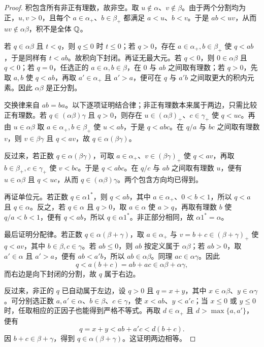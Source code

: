 \begin{proof}
积包含所有非正有理数，故非空。取 \(u\notin\alpha\)、\(v\notin\beta\)。由于两个分割均为正，\(u,v>0\)，且每个 \(a\in\alpha_+\)、\(b\in\beta_+\) 都满足 \(a<u\)、\(b<v\)。于是 \(ab<uv\)，从而 \(uv\notin\alpha\beta\)，积不是全体 \(\mathbb{Q}\)。

若 \(q\in\alpha\beta\) 且 \(t<q\)，则 \(q\le0\) 时 \(t\le0\)；若 \(q>0\)，存在 \(a\in\alpha_+,b\in\beta_+\) 使 \(q<ab\)，于是同样有 \(t<ab\)。故积向下封闭。再证无最大元。若 \(q<0\)，则 \(0\in\alpha\beta\) 且 \(q<0\)；若 \(q=0\)，任选正的 \(a\in\alpha,b\in\beta\)，在 \(0\) 与 \(ab\) 之间取有理数；若 \(q>0\)，先取 \(a,b\) 使 \(q<ab\)，再取 \(a'\in\alpha_+\) 且 \(a'>a\)，便可在 \(q\) 与 \(a'b\) 之间取更大的积内元素。因此 \(\alpha\beta\) 是正分割。

交换律来自 \(ab=ba\)。以下逐项证明结合律；非正有理数本来属于两边，只需比较正有理数。若 \(q\in(\alpha\beta)\gamma\) 且 \(q>0\)，则存在 \(u\in(\alpha\beta)_+\)、\(c\in\gamma_+\) 使 \(q<uc\)。再由 \(u\in\alpha\beta\) 取 \(a\in\alpha_+,b\in\beta_+\) 使 \(u<ab\)，于是 \(q<abc\)。在 \(q/a\) 与 \(bc\) 之间取有理数 \(v\)，则 \(v\in\beta\gamma\) 且 \(q<av\)，故 \(q\in\alpha(\beta\gamma)\)。

反过来，若正数 \(q\in\alpha(\beta\gamma)\)，可取 \(a\in\alpha_+\)、\(v\in(\beta\gamma)_+\) 使 \(q<av\)，再取 \(b\in\beta_+,c\in\gamma_+\) 使 \(v<bc\)。于是 \(q<abc\)。在 \(q/c\) 与 \(ab\) 之间取有理数 \(u\)，便有 \(u\in\alpha\beta\) 且 \(q<uc\)，从而 \(q\in(\alpha\beta)\gamma\)。两个包含方向均已得到。

再证单位元。若正数 \(q\in\alpha1^*\)，则 \(q<ab\)，其中 \(a\in\alpha_+\)、\(0<b<1\)，所以 \(q<a\) 且 \(q\in\alpha\)。反之，若 \(q\in\alpha\) 且 \(q>0\)，取 \(a\in\alpha\) 使 \(a>q\)，再取有理数 \(b\) 使 \(q/a<b<1\)，便有 \(q<ab\)，所以 \(q\in\alpha1^*\)。非正部分相同，故 \(\alpha1^*=\alpha\)。

最后证明分配律。若正数 \(q\in\alpha(\beta+\gamma)\)，取 \(a\in\alpha_+\) 与 \(v=b+c\in(\beta+\gamma)_+\) 使 \(q<av\)，其中 \(b\in\beta,c\in\gamma\)。若 \(ab\le0\)，则 \(ab\) 按定义属于 \(\alpha\beta\)；若 \(ab>0\)，取 \(a'\in\alpha\) 且 \(a'>a\)，便有 \(ab<a'b\)，所以 \(ab\in\alpha\beta\)。同理 \(ac\in\alpha\gamma\)。因此
 \[
   q<a(b+c)=ab+ac\in\alpha\beta+\alpha\gamma,
 \]
而右边是向下封闭的分割，故 \(q\) 属于右边。

反过来，非正的 \(q\) 已自动属于左边，设 \(q>0\) 且 \(q=x+y\)，其中 \(x\in\alpha\beta\)、\(y\in\alpha\gamma\)。可分别选正数 \(a,a'\in\alpha\)、\(b\in\beta\)、\(c\in\gamma\)，使 \(x<ab\)、\(y<a'c\)；当 \(x\le0\) 或 \(y\le0\) 时，任取相应的正因子也能得到严格不等式。再取 \(d\in\alpha_+\) 且 \(d>\max\{a,a'\}\)，便有
\[
  q=x+y<ab+a'c<d(b+c).
\]
因 \(b+c\in\beta+\gamma\)，得到 \(q\in\alpha(\beta+\gamma)\)。这证明两边相等。
\end{proof}

